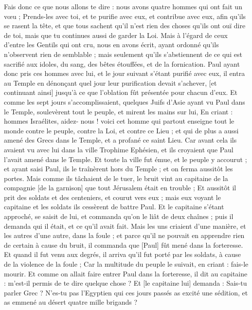\begin{multicols}{2}
Fais donc ce que nous allons te dire : nous avons quatre hommes qui ont fait un vœu ;
Prends-les avec toi, et te purifie avec eux, et contribue avec eux, afin qu'ils se rasent la tête, et que tous sachent qu'il n'est rien des choses qu'ils ont ouï dire de toi, mais que tu continues aussi de garder la Loi.
Mais à l'égard de ceux d'entre les Gentils qui ont cru, nous en avons écrit, ayant ordonné qu'ils n'observent rien de semblable ; mais seulement qu'ils s'abstiennent de ce qui est sacrifié aux idoles, du sang, des bêtes étouffées, et de la fornication.
Paul ayant donc pris ces hommes avec lui, et le jour suivant s'étant purifié avec eux, il entra au Temple en dénonçant quel jour leur purification devait s'achever, [et continuant ainsi] jusqu'à ce que l'oblation fût présentée pour chacun d'eux.
Et comme les sept jours s'accomplissaient, quelques Juifs d'Asie ayant vu Paul dans le Temple, soulevèrent tout le peuple, et mirent les mains sur lui,
En criant : hommes Israélites, aidez- nous ! voici cet homme qui partout enseigne tout le monde contre le peuple, contre la Loi, et contre ce Lieu ; et qui de plus a aussi amené des Grecs dans le Temple, et a profané ce saint Lieu.
Car avant cela ils avaient vu avec lui dans la ville Trophime Ephésien, et ils croyaient que Paul l'avait amené dans le Temple.
Et toute la ville fut émue, et le peuple y accourut ; et ayant saisi Paul, ils le traînèrent hors du Temple ; et on ferma aussitôt les portes.
Mais comme ils tâchaient de le tuer, le bruit vint au capitaine de la compagnie [de la garnison] que tout Jérusalem était en trouble ;
Et aussitôt il prit des soldats et des centeniers, et courut vers eux ; mais eux voyant le capitaine et les soldats ils cessèrent de battre Paul.
Et le capitaine s'étant approché, se saisit de lui, et commanda qu'on le liât de deux chaînes ; puis il demanda qui il était, et ce qu'il avait fait.
Mais les uns criaient d'une manière, et les autres d'une autre, dans la foule ; et parce qu'il ne pouvait en apprendre rien de certain à cause du bruit, il commanda que [Paul] fût mené dans la forteresse.
Et quand il fut venu aux degrés, il arriva qu'il fut porté par les soldats, à cause de la violence de la foule ;
Car la multitude du peuple le suivait, en criant : fais-le mourir.
Et comme on allait faire entrer Paul dans la forteresse, il dit au capitaine : m'est-il permis de te dire quelque chose ? Et [le capitaine lui] demanda : Sais-tu parler Grec ?
N'es-tu pas l'Egyptien qui ces jours passés as excité une sédition, et as emmené au désert quatre mille brigands ?

\end{multicols}
